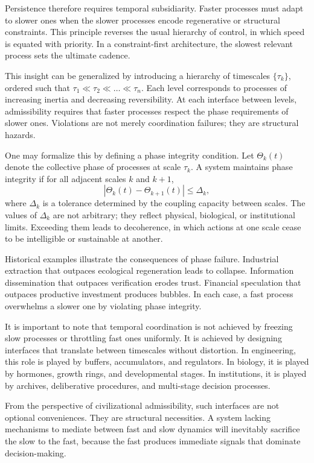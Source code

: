 \documentclass[12pt,oneside]{book}
\begin{document}
Persistence therefore requires temporal subsidiarity. Faster processes must adapt to slower ones when the slower processes encode regenerative or structural constraints. This principle reverses the usual hierarchy of control, in which speed is equated with priority. In a constraint-first architecture, the slowest relevant process sets the ultimate cadence.

This insight can be generalized by introducing a hierarchy of timescales \(\{\tau_k\}\), ordered such that \(\tau_1 \ll \tau_2 \ll \dots \ll \tau_n\). Each level corresponds to processes of increasing inertia and decreasing reversibility. At each interface between levels, admissibility requires that faster processes respect the phase requirements of slower ones. Violations are not merely coordination failures; they are structural hazards.

One may formalize this by defining a phase integrity condition. Let \(\Theta_k(t)\) denote the collective phase of processes at scale \(\tau_k\). A system maintains phase integrity if for all adjacent scales \(k\) and \(k+1\),
\[
|\Theta_k(t) - \Theta_{k+1}(t)| \leq \Delta_k,
\]
where \(\Delta_k\) is a tolerance determined by the coupling capacity between scales. The values of \(\Delta_k\) are not arbitrary; they reflect physical, biological, or institutional limits. Exceeding them leads to decoherence, in which actions at one scale cease to be intelligible or sustainable at another.

Historical examples illustrate the consequences of phase failure. Industrial extraction that outpaces ecological regeneration leads to collapse. Information dissemination that outpaces verification erodes trust. Financial speculation that outpaces productive investment produces bubbles. In each case, a fast process overwhelms a slower one by violating phase integrity.

It is important to note that temporal coordination is not achieved by freezing slow processes or throttling fast ones uniformly. It is achieved by designing interfaces that translate between timescales without distortion. In engineering, this role is played by buffers, accumulators, and regulators. In biology, it is played by hormones, growth rings, and developmental stages. In institutions, it is played by archives, deliberative procedures, and multi-stage decision processes.

From the perspective of civilizational admissibility, such interfaces are not optional conveniences. They are structural necessities. A system lacking mechanisms to mediate between fast and slow dynamics will inevitably sacrifice the slow to the fast, because the fast produces immediate signals that dominate decision-making.
\end{document}
